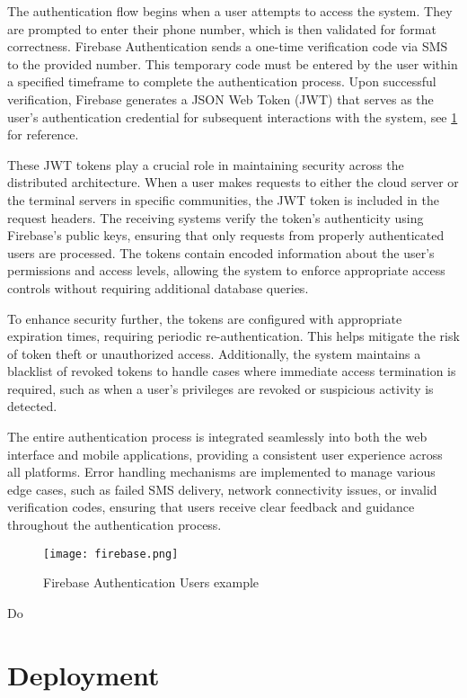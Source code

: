 The authentication flow begins when a user attempts to access the system. They are prompted to enter their phone number, which is then validated for format correctness. Firebase Authentication sends a one-time verification code via SMS to the provided number. This temporary code must be entered by the user within a specified timeframe to complete the authentication process. Upon successful verification, Firebase generates a JSON Web Token (JWT) that serves as the user's authentication credential for subsequent interactions with the system, see \cref{fig:firebase} for reference.

These JWT tokens play a crucial role in maintaining security across the distributed architecture. When a user makes requests to either the cloud server or the terminal servers in specific communities, the JWT token is included in the request headers. The receiving systems verify the token's authenticity using Firebase's public keys, ensuring that only requests from properly authenticated users are processed. The tokens contain encoded information about the user's permissions and access levels, allowing the system to enforce appropriate access controls without requiring additional database queries.

To enhance security further, the tokens are configured with appropriate expiration times, requiring periodic re-authentication. This helps mitigate the risk of token theft or unauthorized access. Additionally, the system maintains a blacklist of revoked tokens to handle cases where immediate access termination is required, such as when a user's privileges are revoked or suspicious activity is detected.

The entire authentication process is integrated seamlessly into both the web interface and mobile applications, providing a consistent user experience across all platforms. Error handling mechanisms are implemented to manage various edge cases, such as failed SMS delivery, network connectivity issues, or invalid verification codes, ensuring that users receive clear feedback and guidance throughout the authentication process.

\begin{figure}
	\texttt{[image: firebase.png]}
	\caption{Firebase Authentication Users example}\label{fig:firebase}
\end{figure}

Do

\section{Deployment}

